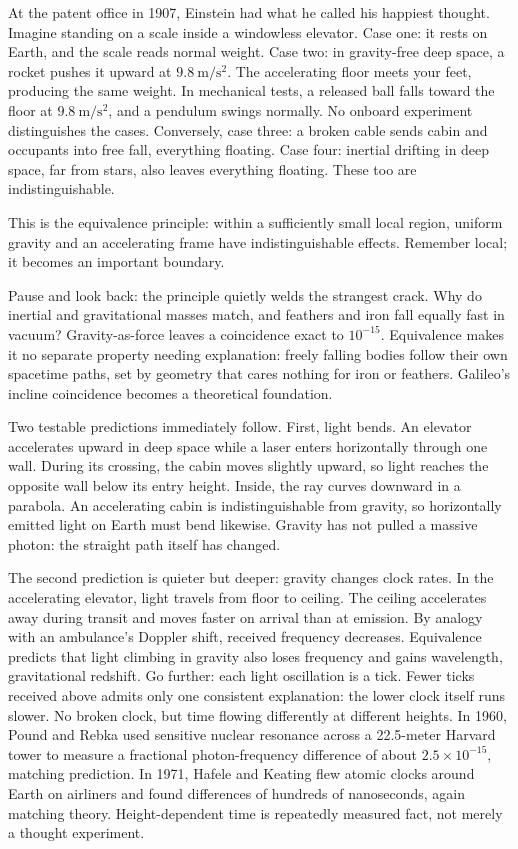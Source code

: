 \begin{mainline}
At the patent office in 1907, Einstein had what he called his happiest thought. Imagine standing on a scale inside a windowless elevator. Case one: it rests on Earth, and the scale reads normal weight. Case two: in gravity-free deep space, a rocket pushes it upward at \(9.8\ \mathrm{m/s^{2}}\). The accelerating floor meets your feet, producing the same weight. In mechanical tests, a released ball falls toward the floor at \(9.8\ \mathrm{m/s^{2}}\), and a pendulum swings normally. No onboard experiment distinguishes the cases. Conversely, case three: a broken cable sends cabin and occupants into free fall, everything floating. Case four: inertial drifting in deep space, far from stars, also leaves everything floating. These too are indistinguishable.

This is the equivalence principle: within a sufficiently small local region, uniform gravity and an accelerating frame have indistinguishable effects. Remember local; it becomes an important boundary.

Pause and look back: the principle quietly welds the strangest crack. Why do inertial and gravitational masses match, and feathers and iron fall equally fast in vacuum? Gravity-as-force leaves a coincidence exact to \(10^{-15}\). Equivalence makes it no separate property needing explanation: freely falling bodies follow their own spacetime paths, set by geometry that cares nothing for iron or feathers. Galileo's incline coincidence becomes a theoretical foundation.

Two testable predictions immediately follow. First, light bends. An elevator accelerates upward in deep space while a laser enters horizontally through one wall. During its crossing, the cabin moves slightly upward, so light reaches the opposite wall below its entry height. Inside, the ray curves downward in a parabola. An accelerating cabin is indistinguishable from gravity, so horizontally emitted light on Earth must bend likewise. Gravity has not pulled a massive photon: the straight path itself has changed.

The second prediction is quieter but deeper: gravity changes clock rates. In the accelerating elevator, light travels from floor to ceiling. The ceiling accelerates away during transit and moves faster on arrival than at emission. By analogy with an ambulance's Doppler shift, received frequency decreases. Equivalence predicts that light climbing in gravity also loses frequency and gains wavelength, gravitational redshift. Go further: each light oscillation is a tick. Fewer ticks received above admits only one consistent explanation: the lower clock itself runs slower. No broken clock, but time flowing differently at different heights. In 1960, Pound and Rebka used sensitive nuclear resonance across a 22.5-meter Harvard tower to measure a fractional photon-frequency difference of about \(2.5\times10^{-15}\), matching prediction. In 1971, Hafele and Keating flew atomic clocks around Earth on airliners and found differences of hundreds of nanoseconds, again matching theory. Height-dependent time is repeatedly measured fact, not merely a thought experiment.


\end{mainline}
